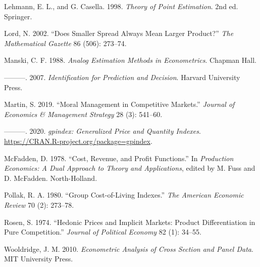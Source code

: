 \documentclass[]{article}
\begin{document}
\leavevmode\hypertarget{ref-lehmann1998}{}%
Lehmann, E. L., and G. Casella. 1998. \emph{Theory of Point Estimation}. 2nd ed. Springer.

\leavevmode\hypertarget{ref-lord2002}{}%
Lord, N. 2002. ``Does Smaller Spread Always Mean Larger Product?'' \emph{The Mathematical Gazette} 86 (506): 273--74.

\leavevmode\hypertarget{ref-manski1988}{}%
Manski, C. F. 1988. \emph{Analog Estimation Methods in Econometrics}. Chapman Hall.

\leavevmode\hypertarget{ref-manski2007}{}%
---------. 2007. \emph{Identification for Prediction and Decision}. Harvard University Press.

\leavevmode\hypertarget{ref-martin2019}{}%
Martin, S. 2019. ``Moral Management in Competitive Markets.'' \emph{Journal of Economics \& Management Strategy} 28 (3): 541--60.

\leavevmode\hypertarget{ref-martin2020}{}%
---------. 2020. \emph{gpindex: Generalized Price and Quantity Indexes}. \url{https://CRAN.R-project.org/package=gpindex}.

\leavevmode\hypertarget{ref-mcfadden1978}{}%
McFadden, D. 1978. ``Cost, Revenue, and Profit Functions.'' In \emph{Production Economics: A Dual Approach to Theory and Applications}, edited by M. Fuss and D. McFadden. North-Holland.

\leavevmode\hypertarget{ref-pollak1980}{}%
Pollak, R. A. 1980. ``Group Cost-of-Living Indexes.'' \emph{The American Economic Review} 70 (2): 273--78.

\leavevmode\hypertarget{ref-rosen1974}{}%
Rosen, S. 1974. ``Hedonic Prices and Implicit Markets: Product Differentiation in Pure Competition.'' \emph{Journal of Political Economy} 82 (1): 34--55.

\leavevmode\hypertarget{ref-wooldridge2010}{}%
Wooldridge, J. M. 2010. \emph{Econometric Analysis of Cross Section and Panel Data}. MIT University Press.
\end{document}
